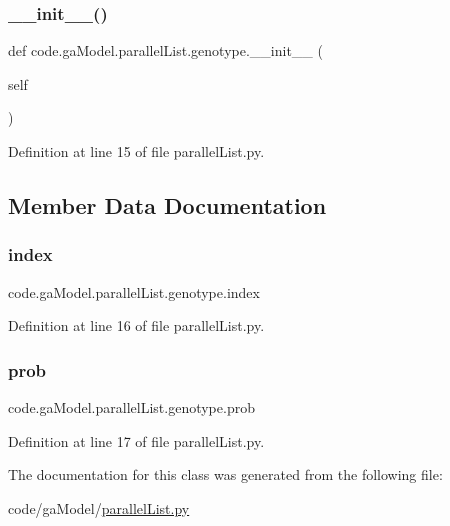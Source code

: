 \subsubsection{\texorpdfstring{\+\_\+\+\_\+init\+\_\+\+\_\+()}{\_\_init\_\_()}}
{\footnotesize\ttfamily def code.\+ga\+Model.\+parallel\+List.\+genotype.\+\_\+\+\_\+init\+\_\+\+\_\+ (\begin{DoxyParamCaption}\item[{}]{self }\end{DoxyParamCaption})}



Definition at line 15 of file parallel\+List.\+py.



\subsection{Member Data Documentation}
\mbox{\label{classcode_1_1ga_model_1_1parallel_list_1_1genotype_a65a45a46f2a173f35759aa6693eee9f4}} 
\subsubsection{\texorpdfstring{index}{index}}
{\footnotesize\ttfamily code.\+ga\+Model.\+parallel\+List.\+genotype.\+index}



Definition at line 16 of file parallel\+List.\+py.

\mbox{\label{classcode_1_1ga_model_1_1parallel_list_1_1genotype_ada7cc089db398d8386f5f29d8e895aef}} 
\subsubsection{\texorpdfstring{prob}{prob}}
{\footnotesize\ttfamily code.\+ga\+Model.\+parallel\+List.\+genotype.\+prob}



Definition at line 17 of file parallel\+List.\+py.



The documentation for this class was generated from the following file\+:\begin{DoxyCompactItemize}
\item 
code/ga\+Model/\hyperlink{parallel_list_8py}{parallel\+List.\+py}\end{DoxyCompactItemize}
